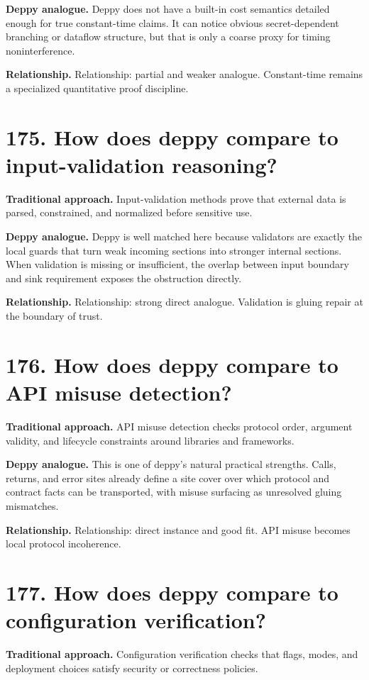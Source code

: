 \documentclass[11pt,openany]{book}
\begin{document}
\textbf{Deppy analogue.} Deppy does not have a built-in cost semantics detailed enough for true constant-time claims. It can notice obvious secret-dependent branching or dataflow structure, but that is only a coarse proxy for timing noninterference.

\textbf{Relationship.} Relationship: partial and weaker analogue. Constant-time remains a specialized quantitative proof discipline.

\section*{175. How does deppy compare to input-validation reasoning?}
\textbf{Traditional approach.} Input-validation methods prove that external data is parsed, constrained, and normalized before sensitive use.

\textbf{Deppy analogue.} Deppy is well matched here because validators are exactly the local guards that turn weak incoming sections into stronger internal sections. When validation is missing or insufficient, the overlap between input boundary and sink requirement exposes the obstruction directly.

\textbf{Relationship.} Relationship: strong direct analogue. Validation is gluing repair at the boundary of trust.

\section*{176. How does deppy compare to API misuse detection?}
\textbf{Traditional approach.} API misuse detection checks protocol order, argument validity, and lifecycle constraints around libraries and frameworks.

\textbf{Deppy analogue.} This is one of deppy's natural practical strengths. Calls, returns, and error sites already define a site cover over which protocol and contract facts can be transported, with misuse surfacing as unresolved gluing mismatches.

\textbf{Relationship.} Relationship: direct instance and good fit. API misuse becomes local protocol incoherence.

\section*{177. How does deppy compare to configuration verification?}
\textbf{Traditional approach.} Configuration verification checks that flags, modes, and deployment choices satisfy security or correctness policies.
\end{document}
